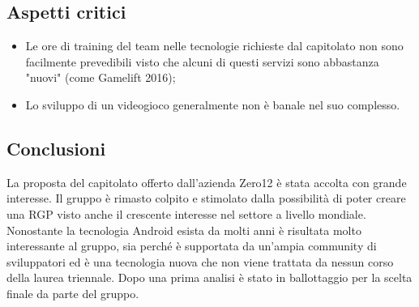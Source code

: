 \subsection{Aspetti critici}
\begin{itemize}
\item Le ore di training del team nelle tecnologie richieste dal capitolato non sono facilmente prevedibili visto che alcuni di questi servizi sono abbastanza "nuovi" (come Gamelift 2016);
\item Lo sviluppo di un videogioco generalmente non è banale nel suo complesso.
\end{itemize}
\subsection{Conclusioni}
La proposta del capitolato offerto dall'azienda Zero12 è stata accolta con grande interesse. Il gruppo è rimasto colpito e stimolato dalla possibilità 
di poter creare una RGP visto anche il crescente interesse nel settore a livello mondiale. Nonostante la tecnologia Android esista da molti anni è risultata molto
interessante al gruppo, sia perché è supportata da un'ampia community di sviluppatori ed è una tecnologia nuova che non viene trattata da nessun corso della laurea triennale. Dopo una prima analisi è stato in ballottaggio per la scelta finale da parte del gruppo.

